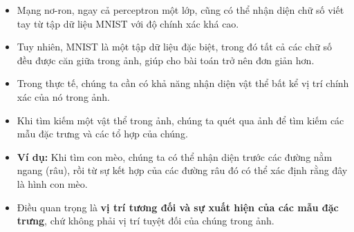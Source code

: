 \documentclass{book}
\begin{document}
\begin{itemize}
    \item Mạng nơ-ron, ngay cả perceptron một lớp, cũng có thể nhận diện chữ số viết tay từ tập dữ liệu MNIST với độ chính xác khá cao.

    \item Tuy nhiên, MNIST là một tập dữ liệu đặc biệt, trong đó tất cả các chữ số đều được căn giữa trong ảnh, giúp cho bài toán trở nên đơn giản hơn.

    \item Trong thực tế, chúng ta cần có khả năng nhận diện vật thể bất kể vị trí chính xác của nó trong ảnh.

    \item Khi tìm kiếm một vật thể trong ảnh, chúng ta quét qua ảnh để tìm kiếm các mẫu đặc trưng và các tổ hợp của chúng.

    \item \textbf{Ví dụ:} Khi tìm con mèo, chúng ta có thể nhận diện trước các đường nằm ngang (râu), rồi từ sự kết hợp của các đường râu đó có thể xác định rằng đây là hình con mèo.

    \item Điều quan trọng là \textbf{vị trí tương đối và sự xuất hiện của các mẫu đặc trưng}, chứ không phải vị trí tuyệt đối của chúng trong ảnh.
\end{itemize}
\end{document}

